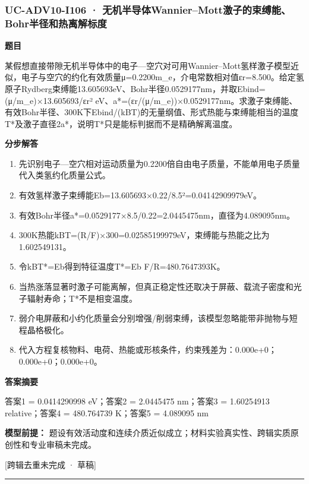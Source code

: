 \documentclass[UTF8,11pt,a4paper]{ctexart}
\begin{document}
\subsubsection*{UC-ADV10-I106 · 无机半导体Wannier–Mott激子的束缚能、Bohr半径和热离解标度}
\noindent\textbf{题目}\par
某假想直接带隙无机半导体中的电子—空穴对可用Wannier–Mott氢样激子模型近似，电子与空穴的约化有效质量μ=0.2200m\_e，介电常数相对值εr=8.500。给定氢原子Rydberg束缚能13.605693eV、Bohr半径0.0529177nm，并取Ebind=(μ/m\_e)×13.605693/εr² eV、a*=(εr/(μ/m\_e))×0.0529177nm。求激子束缚能、有效Bohr半径、300K下Ebind/(kBT)的无量纲值、形式热能与束缚能相当的温度T*及激子直径2a*，说明T*只是能标判据而不是精确解离温度。\par
\medskip\noindent\textbf{分步解答}
\begin{enumerate}
\item 先识别电子—空穴相对运动质量为0.2200倍自由电子质量，不能单用电子质量代入类氢约化质量公式。
\item 有效氢样激子束缚能Eb=13.605693×0.22/8.5²=0.04142909979eV。
\item 有效Bohr半径a*=0.0529177×8.5/0.22=2.0445475nm，直径为4.089095nm。
\item 300K热能kBT=(R/F)×300=0.02585199979eV，束缚能与热能之比为1.602549131。
\item 令kBT*=Eb得到特征温度T*=Eb F/R=480.7647393K。
\item 当热涨落显著时激子可能离解，但真正稳定性还取决于屏蔽、载流子密度和光子辐射寿命；T*不是相变温度。
\item 弱介电屏蔽和小约化质量会分别增强/削弱束缚，该模型忽略能带非抛物与短程晶格极化。
\item 代入方程复核物料、电荷、热能或形核条件，约束残差为：0.000e+0；0.000e+0；0.000e+0。
\end{enumerate}
\noindent\textbf{答案摘要}\par
答案1 = 0.0414290998 eV；答案2 = 2.0445475 nm；答案3 = 1.60254913 relative；答案4 = 480.764739 K；答案5 = 4.089095 nm\par
\noindent\textbf{模型前提：}
题设有效活动度和连续介质近似成立；材料实验真实性、跨辑实质原创性和专业审稿未完成。\par
\noindent\textcolor{red!65!black}{[跨辑去重未完成 · 草稿]} \par
\medskip\hrule\medskip
{}
\end{document}
